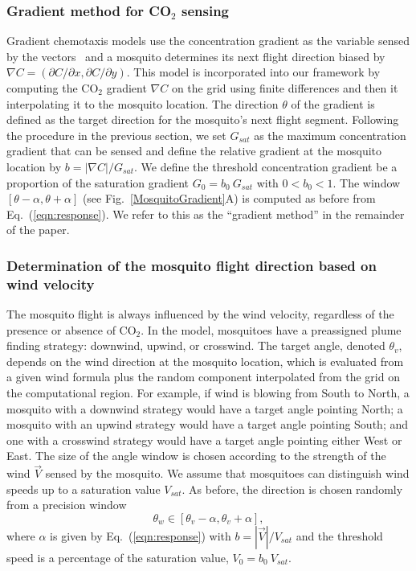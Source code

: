\documentclass[10pt]{article}
\begin{document}
\subsubsection*{Gradient method for CO$_2$ sensing}
Gradient chemotaxis models use the concentration gradient as the variable sensed by 
the vectors~\cite{KellerSegel,Hortsmann} and a mosquito determines its next flight direction 
 biased by  $\nabla C = (\partial C /\partial x,\partial C /\partial y )$.  This model is incorporated into our framework 
by computing the CO$_2$ gradient $\nabla C$ on the grid using finite differences and then it 
interpolating it to
the mosquito location.  The direction $\theta$ of the gradient
is defined as the target direction for the mosquito's next flight
segment. 
Following the procedure in the previous section, we set $G_{sat}$ as the maximum 
concentration gradient that can be sensed and define the relative gradient at  the mosquito
location by $b = |\nabla C|/G_{sat}$.  We define the threshold
concentration gradient be a proportion of the saturation
gradient $G_0 = b_0\ G_{sat}$ with $0<b_0<1$.
The window $[\theta-\alpha,\theta+\alpha]$ (see Fig.~\ref{MosquitoGradient}A) is computed as before 
from Eq.~(\ref{eqn:response}).  We refer to this as the ``gradient method'' in the remainder of the paper.

\subsubsection*{Determination of the mosquito flight direction based on wind velocity}
The mosquito flight is always influenced by the wind velocity, regardless of the presence or absence of CO$_2$. 
In the model, mosquitoes have a preassigned plume finding strategy: downwind, upwind, or crosswind.
The target angle, denoted $\theta_v$, depends on the wind direction at the mosquito location, which is
evaluated from a given wind formula plus the random component
interpolated from the grid on the computational region.  
For example, if wind is blowing from South to North, a mosquito with a downwind strategy would have a target angle pointing North; a mosquito with an upwind strategy would have a target angle pointing South; and one with
a crosswind strategy would have a target angle pointing either West or East.
%
The size of the angle window is chosen according to the strength of the wind $\vec V$ sensed by the mosquito.  
We assume that mosquitoes can distinguish wind speeds up to a saturation value $V_{sat}$.  As
before, the direction is chosen randomly from a precision window
\begin{equation}
	 \theta_w \in [\theta_v-\alpha,\theta_v+\alpha], \label{eqn:thetav}
\end{equation}
where $\alpha$ is given by Eq.~(\ref{eqn:response}) with $b = |\vec{V}|/V_{sat}$ and the threshold speed 
is a percentage of the saturation value, $V_0 = b_0\ V_{sat}$. 
\end{document}
